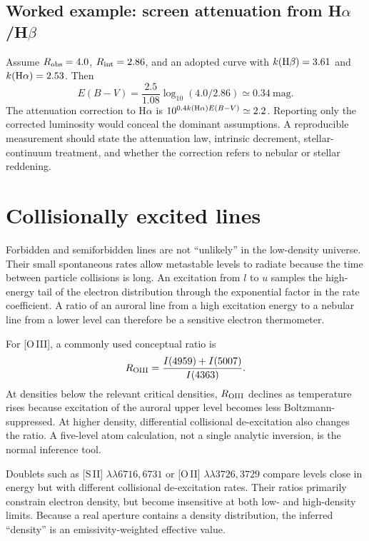 \subsection{Worked example: screen attenuation from
H\texorpdfstring{$\alpha$/H$\beta$}{-alpha/H-beta}}

Assume $R_{\rm obs}=4.0$, $R_{\rm int}=2.86$, and an adopted curve with
$k({\rm H}\beta)=3.61$ and $k({\rm H}\alpha)=2.53$.  Then
\begin{equation}
 E(B-V)=\frac{2.5}{1.08}\log_{10}(4.0/2.86)\simeq0.34~\mathrm{mag}.
\end{equation}
The attenuation correction to H$\alpha$ is
$10^{0.4k({\rm H}\alpha)E(B-V)}\simeq2.2$.  Reporting only the corrected luminosity
would conceal the dominant assumptions.  A reproducible measurement should state
the attenuation law, intrinsic decrement, stellar-continuum treatment, and whether
the correction refers to nebular or stellar reddening.

\section{Collisionally excited lines}

Forbidden and semiforbidden lines are not ``unlikely'' in the low-density universe.
Their small spontaneous rates allow metastable levels to radiate because the time
between particle collisions is long.  An excitation from $l$ to $u$ samples the
high-energy tail of the electron distribution through the exponential factor in the
rate coefficient.  A ratio of an auroral line from a high excitation energy to a
nebular line from a lower level can therefore be a sensitive electron thermometer.

For [O\,III], a commonly used conceptual ratio is
\begin{equation}
 R_{\rm OIII}=\frac{I(4959)+I(5007)}{I(4363)}.
 \label{eq:oiii-temperature-ratio}
\end{equation}
At densities below the relevant critical densities, $R_{\rm OIII}$ declines as
temperature rises because excitation of the auroral upper level becomes less
Boltzmann-suppressed.  At higher density, differential collisional de-excitation also
changes the ratio.  A five-level atom calculation, not a single analytic inversion,
is the normal inference tool.

Doublets such as [S\,II] $\lambda\lambda6716,6731$ or [O\,II]
$\lambda\lambda3726,3729$ compare levels close in energy but with different
collisional de-excitation rates.  Their ratios primarily constrain electron density,
but become insensitive at both low- and high-density limits.  Because a real aperture
contains a density distribution, the inferred ``density'' is an emissivity-weighted
effective value.

